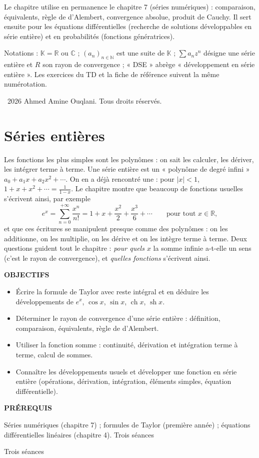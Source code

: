 \documentclass[a4paper,11pt]{article}
\numberwithin{equation}{section}
\numberwithin{figure}{section}
\numberwithin{table}{section}
\theoremstyle{enonce}
\theoremstyle{exemple}
\theoremstyle{remarque}
\newcommand{\ouverture}[3]{%
  \begin{tcolorbox}[enhanced,colback=Fond,colframe=Fond,arc=0pt,boxrule=0pt,left=12pt,right=12pt,top=10pt,bottom=10pt,
     before skip=1.2em,after skip=1.6em]
  \begin{minipage}[t]{0.56\linewidth}
  {\sffamily\bfseries\small\color{Bleu}OBJECTIFS}\par\vspace{0.3em}\small #1
  \end{minipage}\hfill
  \begin{minipage}[t]{0.38\linewidth}
  {\sffamily\bfseries\small\color{Bleu}PRÉREQUIS}\par\vspace{0.3em}\small #2
  \ifx\relax#3\relax\else\par\vspace{0.6em}{\sffamily\bfseries\small\color{Bleu}DURÉE}\par\vspace{0.2em}\small #3\fi
  \end{minipage}
  \end{tcolorbox}}
\newcommand{\K}{\mathbb{K}}
\newcommand{\R}{\mathbb{R}}
\newcommand{\C}{\mathbb{C}}
\newcommand{\N}{\mathbb{N}}
\newcommand{\sh}{\operatorname{sh}}
\newcommand{\ch}{\operatorname{ch}}
\newif\ifonglets \ongletsfalse
\begin{document}
Le chapitre utilise en permanence le chapitre 7 (séries numériques) : comparaison, équivalents, règle de d'Alembert,
convergence absolue, produit de Cauchy. Il sert ensuite pour les équations différentielles (recherche de solutions
développables en série entière) et en probabilités (fonctions génératrices).

Notations : $\K=\R$ ou $\C$ ; $(a_n)_{n\in\N}$ est une suite de $\K$ ; $\sum a_nz^n$ désigne une série entière et $R$ son rayon
de convergence ; « DSE » abrège « développement en série entière ». Les exercices du TD et la fiche de référence suivent la même
numérotation.

\vfill
{\footnotesize\sffamily\color{Gris}\textcopyright~2026 Ahmed Amine Ouqlani. Tous droits réservés.\par}
\clearpage
\thispagestyle{plain}
\hypertarget{toc}{}
\renewcommand{\contentsname}{Sommaire}
\tableofcontents
\clearpage
{}
\ongletstrue
\section{Séries entières}\label{sec:se}

Les fonctions les plus simples sont les polynômes : on sait les calculer, les dériver, les intégrer terme à terme. Une série
entière est un « polynôme de degré infini » $a_0+a_1x+a_2x^2+\cdots$. On en a déjà rencontré une : pour $|x|<1$,
$1+x+x^2+\cdots=\frac1{1-x}$. Le chapitre montre que beaucoup de fonctions usuelles s'écrivent ainsi, par exemple
\[e^x=\sum_{n=0}^{+\infty}\frac{x^n}{n!}=1+x+\frac{x^2}2+\frac{x^3}6+\cdots\qquad\text{pour tout }x\in\R,\]
et que ces écritures se manipulent presque comme des polynômes : on les additionne, on les multiplie, on les dérive et on les
intègre terme à terme. Deux questions guident tout le chapitre : \emph{pour quels $x$} la somme infinie a-t-elle un sens (c'est
le rayon de convergence), et \emph{quelles fonctions} s'écrivent ainsi.

\ouverture{%
\begin{itemize}[leftmargin=1.1em,itemsep=1pt]
\item Écrire la formule de Taylor avec reste intégral et en déduire les développements de $e^x$, $\cos x$, $\sin x$, $\ch x$, $\sh x$.
\item Déterminer le rayon de convergence d'une série entière : définition, comparaison, équivalents, règle de d'Alembert.
\item Utiliser la fonction somme : continuité, dérivation et intégration terme à terme, calcul de sommes.
\item Connaître les développements usuels et développer une fonction en série entière (opérations, dérivation, intégration,
éléments simples, équation différentielle).
\end{itemize}}{%
Séries numériques (chapitre 7) ; formules de Taylor (première année) ; équations différentielles linéaires (chapitre 4).}{Trois séances}
\end{document}
